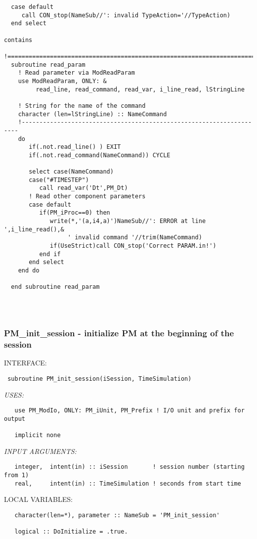 \begin{verbatim}
  case default
     call CON_stop(NameSub//': invalid TypeAction='//TypeAction)
  end select

contains
  !========================================================================
  subroutine read_param
    ! Read parameter via ModReadParam
    use ModReadParam, ONLY: &
         read_line, read_command, read_var, i_line_read, lStringLine

    ! String for the name of the command
    character (len=lStringLine) :: NameCommand
    !---------------------------------------------------------------------
    do
       if(.not.read_line() ) EXIT
       if(.not.read_command(NameCommand)) CYCLE

       select case(NameCommand)
       case("#TIMESTEP")
          call read_var('Dt',PM_Dt)
       ! Read other component parameters
       case default
          if(PM_iProc==0) then
             write(*,'(a,i4,a)')NameSub//': ERROR at line ',i_line_read(),&
                  ' invalid command '//trim(NameCommand)
             if(UseStrict)call CON_stop('Correct PARAM.in!')
          end if
       end select
    end do

  end subroutine read_param
 
\end{verbatim}
 
 
\mbox{}\hrulefill\ 
 
\newpage


\subsubsection{ PM\_init\_session - initialize PM at the beginning of the session }


\bigskip
{\sf INTERFACE:}
\begin{verbatim} subroutine PM_init_session(iSession, TimeSimulation)\end{verbatim}
{\em USES:}
\begin{verbatim}   use PM_ModIo, ONLY: PM_iUnit, PM_Prefix ! I/O unit and prefix for output
 
   implicit none
 \end{verbatim}
{\em INPUT ARGUMENTS:}
\begin{verbatim}   integer,  intent(in) :: iSession       ! session number (starting from 1)
   real,     intent(in) :: TimeSimulation ! seconds from start time
 \end{verbatim}
{\sf LOCAL VARIABLES:}
\begin{verbatim}   character(len=*), parameter :: NameSub = 'PM_init_session'
 
   logical :: DoInitialize = .true.\end{verbatim}


